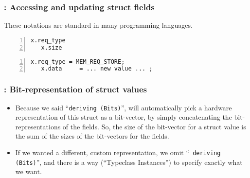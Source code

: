 
\begin{frame}[fragile]
\frametitle{{\BSV}: Accessing and updating struct fields}

\footnotesize

These notations are standard in many programming languages.

\vspace{5ex}

\begin{Verbatim}[frame=single, numbers=left]
   x.req_type
   x.size
\end{Verbatim}

\vspace{5ex}

\begin{Verbatim}[frame=single, numbers=left]
   x.req_type = MEM_REQ_STORE;
   x.data     = ... new value ... ;
\end{Verbatim}

\end{frame}


\begin{frame}[fragile]
\frametitle{{\BSV}: Bit-representation of struct values}

\footnotesize

\begin{itemize}

 \item Because we said ``{\tt deriving (Bits)}'', {\bsc} will
       automatically pick a hardware representation of this struct as
       a bit-vector, by simply concatenating the bit-representations
       of the fields.  So, the size of the bit-vector for a struct
       value is the sum of the sizes of the bit-vectors for the
       fields.

 \PAUSE{\vspace{4ex}}

 \item If we wanted a different, custom representation, we omit ``{\tt
       deriving (Bits)}'', and there is a way (``Typeclass
       Instances'') to specify exactly what we want.

\end{itemize}

\end{frame}


